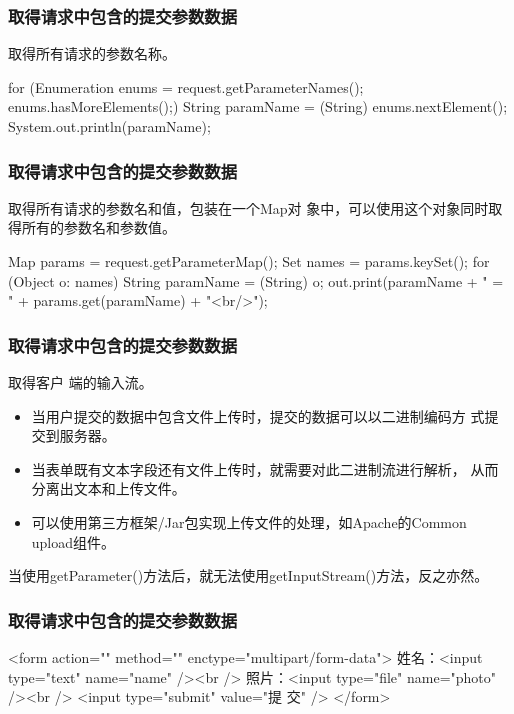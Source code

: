 \begin{frame}[fragile] %
  \frametitle{取得请求中包含的提交参数数据} 
   取得所有请求的参数名称。

  \begin{javaCode}
    for (Enumeration enums = request.getParameterNames(); enums.hasMoreElements();) {
      String paramName = (String) enums.nextElement();
      System.out.println(paramName);
    }
  \end{javaCode}
\end{frame}

\begin{frame}[fragile] %
  \frametitle{取得请求中包含的提交参数数据} 

   取得所有请求的参数名和值，包装在一个Map对
  象中，可以使用这个对象同时取得所有的参数名和参数值。

  \begin{javaCode}
    Map params = request.getParameterMap();
    Set names = params.keySet();
    for (Object o: names) {
      String paramName = (String) o;
      out.print(paramName + " = " + params.get(paramName) + "<br/>");
    }
  \end{javaCode}
\end{frame}

\begin{frame} %
  \frametitle{取得请求中包含的提交参数数据} 

   取得客户
  端的输入流。

  \begin{itemize}
  \item 当用户提交的数据中包含文件上传时，提交的数据可以以二进制编码方
    式提交到服务器。
  \item 当表单既有文本字段还有文件上传时，就需要对此二进制流进行解析，
    从而分离出文本和上传文件。
  \item 可以使用第三方框架/Jar包实现上传文件的处理，如{\kai\Blue Apache的Common
      upload组件}。
  \end{itemize}


  {\kai 当使用getParameter()方法后，就无法使用getInputStream()方法，反之亦然。}


\end{frame}

\begin{frame} %
  \frametitle{取得请求中包含的提交参数数据} 

  \begin{xmlCode}
    <form action="" method="" enctype="multipart/form-data">
      姓名：<input type="text" name="name" /><br />
      照片：<input type="file" name="photo" /><br />
      <input type="submit" value="提 交" />
    </form>
\end{xmlCode}
\end{frame}

